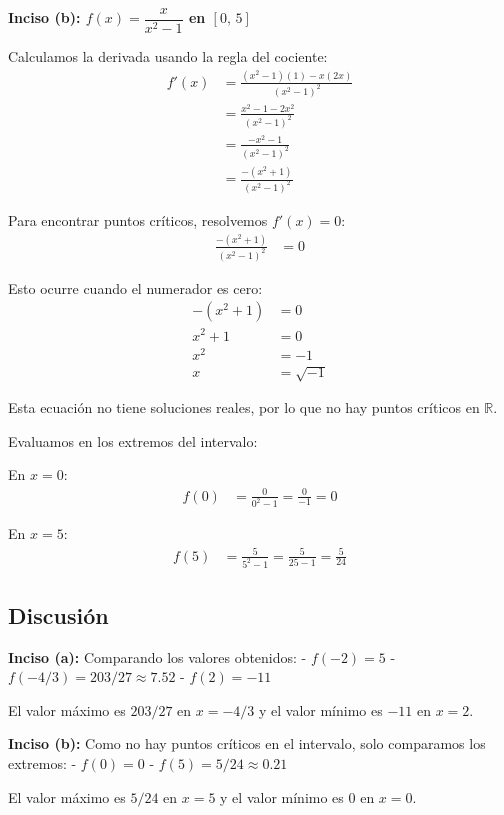 \documentclass{article}
\begin{document}
\textbf{Inciso (b): $f(x) = \dfrac{x}{x^{2}-1}$ en $[0,\,5]$}

Calculamos la derivada usando la regla del cociente:
\begin{align}
f'(x) &= \frac{(x^{2}-1)(1) - x(2x)}{(x^{2}-1)^{2}} \\
&= \frac{x^{2} - 1 - 2x^{2}}{(x^{2}-1)^{2}} \\
&= \frac{-x^{2} - 1}{(x^{2}-1)^{2}} \\
&= \frac{-(x^{2} + 1)}{(x^{2}-1)^{2}}
\end{align}

Para encontrar puntos críticos, resolvemos $f'(x) = 0$:
\begin{align}
\frac{-(x^{2} + 1)}{(x^{2}-1)^{2}} &= 0
\end{align}

Esto ocurre cuando el numerador es cero:
\begin{align}
-(x^{2} + 1) &= 0 \\
x^{2} + 1 &= 0 \\
x^{2} &= -1 \\
x &= \sqrt{-1}
\end{align}

Esta ecuación no tiene soluciones reales, por lo que no hay puntos críticos en $\mathbb{R}$.

Evaluamos en los extremos del intervalo:

En $x = 0$:
\begin{align}
f(0) &= \frac{0}{0^{2} - 1} = \frac{0}{-1} = 0
\end{align}

En $x = 5$:
\begin{align}
f(5) &= \frac{5}{5^{2} - 1} = \frac{5}{25 - 1} = \frac{5}{24}
\end{align}

\subsection{Discusión}

\textbf{Inciso (a):} 
Comparando los valores obtenidos:
- $f(-2) = 5$
- $f(-4/3) = 203/27 \approx 7.52$  
- $f(2) = -11$

El valor máximo es $203/27$ en $x = -4/3$ y el valor mínimo es $-11$ en $x = 2$.

\textbf{Inciso (b):}
Como no hay puntos críticos en el intervalo, solo comparamos los extremos:
- $f(0) = 0$
- $f(5) = 5/24 \approx 0.21$

El valor máximo es $5/24$ en $x = 5$ y el valor mínimo es $0$ en $x = 0$.
\end{document}
